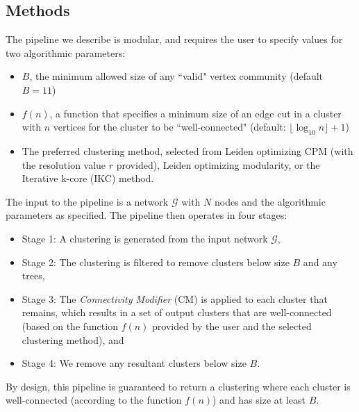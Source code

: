 \documentclass[a4paper]{article}   	%
\begin{document}
\subsection{Methods}
The pipeline we describe is modular, and requires the user to specify values for two algorithmic parameters:
\begin{itemize}
\item $B$, the minimum allowed size of any ``valid" vertex community (default $B=11$)
\item $f(n)$, a function that specifies a minimum size of an edge cut in a cluster with $n$ vertices  for the cluster to be ``well-connected" (default: $ \lfloor \log_{10} n \rfloor +1$)
\item The preferred clustering method, selected from Leiden optimizing CPM (with the resolution value $r$ provided), Leiden optimizing modularity, or the Iterative k-core (IKC) method.
\end{itemize}

\noindent
The input to the pipeline is a network $\mathcal{G}$ with $N$ nodes and the algorithmic parameters as specified.
The pipeline then operates in four stages:
\begin{itemize}
\item
Stage 1: A clustering is generated  from the input network $\mathcal{G}$,
\item Stage 2: The clustering is filtered  to remove clusters below size $B$  and any trees,
\item Stage 3: The \emph{Connectivity Modifier} (CM) is applied to each cluster that remains, which results in a set of output clusters that are well-connected (based on the function $f(n)$ provided by the user and the selected clustering method), and
\item Stage 4: We remove any resultant clusters below size $B$.
\end{itemize}
By design, this pipeline is guaranteed to return a clustering where each cluster is well-connected (according to the function $f(n)$)  and has size at least $B$.
\end{document}
